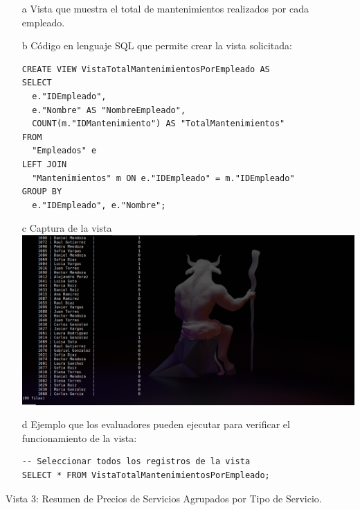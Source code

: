 \documentclass[12pt]{article}
\begin{document}
    \begin{itemize}
        \item[a] Vista que muestra el total de mantenimientos realizados por cada empleado. 
        \item[b] Código en lenguaje SQL que permite crear la vista solicitada:
        \begin{lstlisting}
CREATE VIEW VistaTotalMantenimientosPorEmpleado AS
SELECT
  e."IDEmpleado",
  e."Nombre" AS "NombreEmpleado",
  COUNT(m."IDMantenimiento") AS "TotalMantenimientos"
FROM
  "Empleados" e
LEFT JOIN
  "Mantenimientos" m ON e."IDEmpleado" = m."IDEmpleado"
GROUP BY
  e."IDEmpleado", e."Nombre";
        \end{lstlisting}
        \item[c] Captura de la vista
        \center\includegraphics[width=1.0\textwidth]{O.png}
        \item[d] Ejemplo que los evaluadores pueden ejecutar para verificar el funcionamiento de la vista:
        \begin{lstlisting}
-- Seleccionar todos los registros de la vista
SELECT * FROM VistaTotalMantenimientosPorEmpleado;
         \end{lstlisting}
    \end{itemize}
    Vista 3: Resumen de Precios de Servicios Agrupados por Tipo de Servicio.
\end{document}
